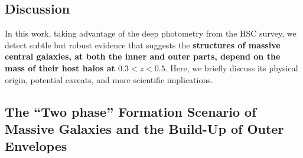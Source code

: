 \documentclass{emulateapj}
\begin{document}
\begin{CJK*}{UTF8}{gbsn}
\section{Discussion}
    \label{sec:discussion}
    
    In this work, taking advantage of the deep photometry from the HSC survey, we 
    detect subtle but robust evidence that suggests the \textbf{structures
    of massive central galaxies, at both the inner and outer parts, depend on the mass of
    their host halos at $0.3 < z < 0.5$}. 
    Here, we briefly discuss its physical origin, potential caveats, and more scientific 
    implications.  
         
    
\subsection{The ``Two phase'' Formation Scenario of Massive Galaxies and the 
            Build-Up of Outer Envelopes}
    

\end{CJK*}
\end{document}
